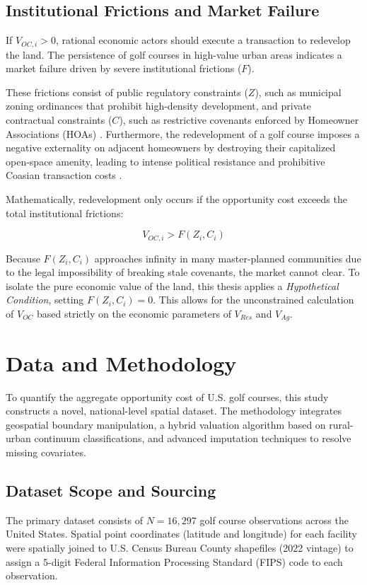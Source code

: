 \documentclass[10pt, letterpaper]{article}
\begin{document}
\subsection{Institutional Frictions and Market Failure}
If $V_{OC, i} > 0$, rational economic actors should execute a transaction to redevelop the land. The persistence of golf courses in high-value urban areas indicates a market failure driven by severe institutional frictions ($F$). 

These frictions consist of public regulatory constraints ($Z$), such as municipal zoning ordinances that prohibit high-density development, and private contractual constraints ($C$), such as restrictive covenants enforced by Homeowner Associations (HOAs) \parencite{Ellickson2022, Korngold2024}. Furthermore, the redevelopment of a golf course imposes a negative externality on adjacent homeowners by destroying their capitalized open-space amenity, leading to intense political resistance and prohibitive Coasian transaction costs \parencite{Coase1960}.

Mathematically, redevelopment only occurs if the opportunity cost exceeds the total institutional frictions:

\begin{equation}
    V_{OC, i} > F(Z_i, C_i)
\end{equation}

Because $F(Z_i, C_i)$ approaches infinity in many master-planned communities due to the legal impossibility of breaking stale covenants, the market cannot clear. To isolate the pure economic value of the land, this thesis applies a \textit{Hypothetical Condition}, setting $F(Z_i, C_i) = 0$. This allows for the unconstrained calculation of $V_{OC}$ based strictly on the economic parameters of $V_{Res}$ and $V_{Ag}$.

\newpage

\section{Data and Methodology}

To quantify the aggregate opportunity cost of U.S. golf courses, this study constructs a novel, national-level spatial dataset. The methodology integrates geospatial boundary manipulation, a hybrid valuation algorithm based on rural-urban continuum classifications, and advanced imputation techniques to resolve missing covariates.

\subsection{Dataset Scope and Sourcing}
The primary dataset consists of $N = 16,297$ golf course observations across the United States. Spatial point coordinates (latitude and longitude) for each facility were spatially joined to U.S. Census Bureau County shapefiles (2022 vintage) to assign a 5-digit Federal Information Processing Standard (FIPS) code to each observation.
\end{document}
